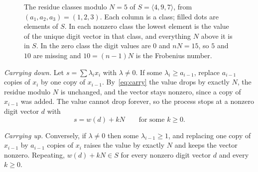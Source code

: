 \documentclass[11pt]{amsart}
\theoremstyle{remark}
\begin{document}
\begin{figure}[ht]
\centering
{}
\caption{The residue classes modulo $N=5$ of $S=\langle4,9,7\rangle$, from $(a_1,a_2,a_3)=(1,2,3)$. Each column is a class; filled dots are elements of $S$. In each nonzero class the lowest element is the value of the unique digit vector in that class, and everything $N$ above it is in $S$. In the zero class the digit values are $0$ and $nN=15$, so $5$ and $10$ are missing and $10=(n-1)N$ is the Frobenius number.}
\label{fig:ladders}
\end{figure}

\emph{Carrying down.} Let $s=\sum\lambda_ix_i$ with $\lambda\ne0$. If some $\lambda_i\ge a_{i-1}$, replace $a_{i-1}$ copies of $x_i$ by one copy of $x_{i-1}$. By~\eqref{eq:carry} the value drops by exactly $N$, the residue modulo $N$ is unchanged, and the vector stays nonzero, since a copy of $x_{i-1}$ was added. The value cannot drop forever, so the process stops at a nonzero digit vector $d$ with
\begin{equation}\label{eq:down}
s=w(d)+kN\qquad\text{for some }k\ge0 .
\end{equation}

\emph{Carrying up.} Conversely, if $\lambda\ne0$ then some $\lambda_{i-1}\ge1$, and replacing one copy of $x_{i-1}$ by $a_{i-1}$ copies of $x_i$ raises the value by exactly $N$ and keeps the vector nonzero. Repeating, $w(d)+kN\in S$ for every nonzero digit vector $d$ and every $k\ge0$.
\end{document}

